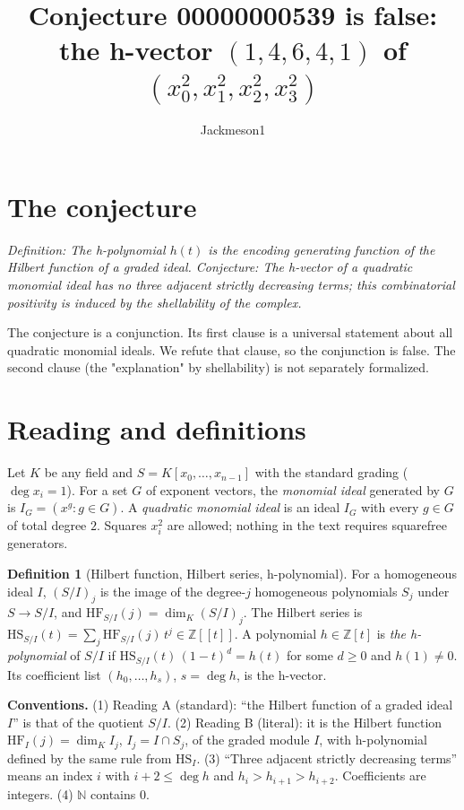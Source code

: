 \documentclass[11pt]{article}
\title{Conjecture 00000000539 is false:\\ the h-vector $(1,4,6,4,1)$ of $(x_0^2,x_1^2,x_2^2,x_3^2)$}
\author{Jackmeson1}
\date{}
\theoremstyle{definition}
\newtheorem{definition}[theorem]{Definition}
\begin{document}
\maketitle

\section{The conjecture}
\emph{Definition: The h-polynomial $h(t)$ is the encoding generating function of the Hilbert
function of a graded ideal. Conjecture: The h-vector of a quadratic monomial ideal has no three
adjacent strictly decreasing terms; this combinatorial positivity is induced by the shellability
of the complex.}

The conjecture is a conjunction. Its first clause is a universal statement about all quadratic
monomial ideals. We refute that clause, so the conjunction is false. The second clause (the
"explanation" by shellability) is not separately formalized.

\section{Reading and definitions}
Let $K$ be any field and $S=K[x_0,\dots,x_{n-1}]$ with the standard grading ($\deg x_i=1$).
For a set $G$ of exponent vectors, the \emph{monomial ideal} generated by $G$ is
$I_G=(x^g : g\in G)$. A \emph{quadratic monomial ideal} is an ideal $I_G$ with every $g\in G$ of
total degree $2$. Squares $x_i^2$ are allowed; nothing in the text requires squarefree generators.

\begin{definition}[Hilbert function, Hilbert series, h-polynomial]
For a homogeneous ideal $I$, $(S/I)_j$ is the image of the degree-$j$ homogeneous polynomials
$S_j$ under $S\to S/I$, and $\mathrm{HF}_{S/I}(j)=\dim_K (S/I)_j$. The Hilbert series is
$\mathrm{HS}_{S/I}(t)=\sum_j \mathrm{HF}_{S/I}(j)\,t^j\in\mathbb{Z}[[t]]$. A polynomial
$h\in\mathbb{Z}[t]$ is \emph{the h-polynomial} of $S/I$ if
$\mathrm{HS}_{S/I}(t)\,(1-t)^d=h(t)$ for some $d\ge 0$ and $h(1)\neq 0$. Its coefficient list
$(h_0,\dots,h_s)$, $s=\deg h$, is the h-vector.
\end{definition}

\noindent\textbf{Conventions.} (1) Reading A (standard): ``the Hilbert function of a graded
ideal $I$'' is that of the quotient $S/I$. (2) Reading B (literal): it is the Hilbert function
$\mathrm{HF}_I(j)=\dim_K I_j$, $I_j=I\cap S_j$, of the graded module $I$, with h-polynomial
defined by the same rule from $\mathrm{HS}_I$. (3) ``Three adjacent strictly decreasing terms''
means an index $i$ with $i+2\le\deg h$ and $h_i>h_{i+1}>h_{i+2}$. Coefficients are integers.
(4) $\mathbb{N}$ contains $0$.
\end{document}
